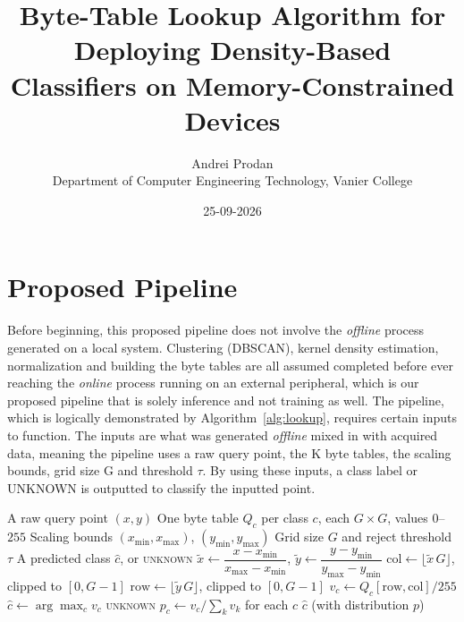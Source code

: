 \documentclass[10pt,a4paper,twocolumn]{article}
\title{Byte-Table Lookup Algorithm for Deploying Density-Based \\
       Classifiers on Memory-Constrained Devices}
\author{Andrei Prodan \\ Department of Computer Engineering Technology, Vanier College}
\date{25-09-2026}
\begin{document}
\maketitle
 
\section{Proposed Pipeline}

 Before beginning, this proposed pipeline does not involve the \emph{offline} process generated on a local system. Clustering (DBSCAN), kernel density estimation, normalization and building the byte tables are all assumed completed before ever reaching the \emph{online} process running on an external peripheral, which is our proposed pipeline that is solely inference and not training as well. The pipeline, which is logically demonstrated by Algorithm~\ref{alg:lookup}, requires certain inputs to function. The inputs are what was generated \emph{offline} mixed in with acquired data, meaning the pipeline uses a raw query point, the K byte tables, the scaling bounds, grid size G and threshold $\tau$. By using these inputs, a class label or UNKNOWN is outputted to classify the inputted point.
\begin{algorithm}[!bt]
\caption{Table-lookup classification (online path).}
\label{alg:lookup}
\begin{algorithmic}[1]
\Require A raw query point $(x,y)$
\Require One byte table $Q_c$ per class $c$, each $G \times G$, values $0$--$255$
\Require Scaling bounds $(x_{\min},x_{\max})$, $(y_{\min},y_{\max})$
\Require Grid size $G$ and reject threshold $\tau$
\Ensure A predicted class $\hat{c}$, or \textsc{unknown}
\State $\tilde{x} \gets \dfrac{x - x_{\min}}{x_{\max}-x_{\min}}$,\quad
       $\tilde{y} \gets \dfrac{y - y_{\min}}{y_{\max}-y_{\min}}$
\State $\text{col} \gets \lfloor \tilde{x}\,G \rfloor$, clipped to $[0,G-1]$
\State $\text{row} \gets \lfloor \tilde{y}\,G \rfloor$, clipped to $[0,G-1]$
    \State $v_c \gets Q_c[\text{row},\text{col}] / 255$ 
\EndFor
\State $\hat{c} \gets \arg\max_c v_c$ 
    \State \Return \textsc{unknown} 
\EndIf
\State $p_c \gets v_c / \sum_k v_k$ for each $c$ 
\State \Return $\hat{c}$ (with distribution $p$)
\end{algorithmic}
\end{algorithm}
 
\end{document}
